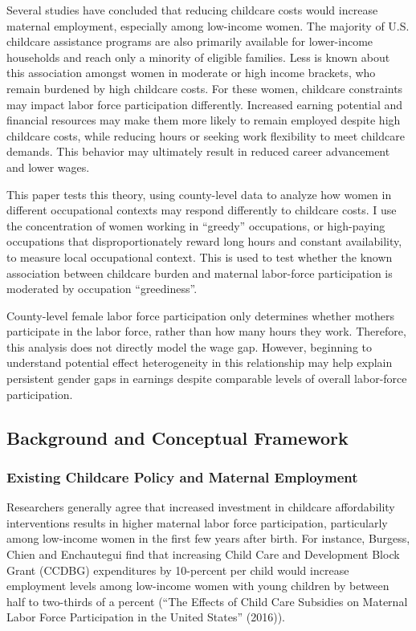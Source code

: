 \documentclass[
  letterpaper,
  DIV=11,
  numbers=noendperiod]{scrartcl}
\begin{document}
Several studies have concluded that reducing childcare costs would
increase maternal employment, especially among low-income women. The
majority of U.S. childcare assistance programs are also primarily
available for lower-income households and reach only a minority of
eligible families. Less is known about this association amongst women in
moderate or high income brackets, who remain burdened by high childcare
costs. For these women, childcare constraints may impact labor force
participation differently. Increased earning potential and financial
resources may make them more likely to remain employed despite high
childcare costs, while reducing hours or seeking work flexibility to
meet childcare demands. This behavior may ultimately result in reduced
career advancement and lower wages.

This paper tests this theory, using county-level data to analyze how
women in different occupational contexts may respond differently to
childcare costs. I use the concentration of women working in ``greedy''
occupations, or high-paying occupations that disproportionately reward
long hours and constant availability, to measure local occupational
context. This is used to test whether the known association between
childcare burden and maternal labor-force participation is moderated by
occupation ``greediness''.

County-level female labor force participation only determines whether
mothers participate in the labor force, rather than how many hours they
work. Therefore, this analysis does not directly model the wage gap.
However, beginning to understand potential effect heterogeneity in this
relationship may help explain persistent gender gaps in earnings despite
comparable levels of overall labor-force participation.

\subsection{Background and Conceptual
Framework}\label{background-and-conceptual-framework}

\subsubsection{Existing Childcare Policy and Maternal
Employment}\label{existing-childcare-policy-and-maternal-employment}

Researchers generally agree that increased investment in childcare
affordability interventions results in higher maternal labor force
participation, particularly among low-income women in the first few
years after birth. For instance, Burgess, Chien and Enchautegui find
that increasing Child Care and Development Block Grant (CCDBG)
expenditures by 10-percent per child would increase employment levels
among low-income women with young children by between half to two-thirds
of a percent ({``The {Effects} of {Child} {Care} {Subsidies} on
{Maternal} {Labor} {Force} {Participation} in the {United} {States}''}
(2016)).
\end{document}
